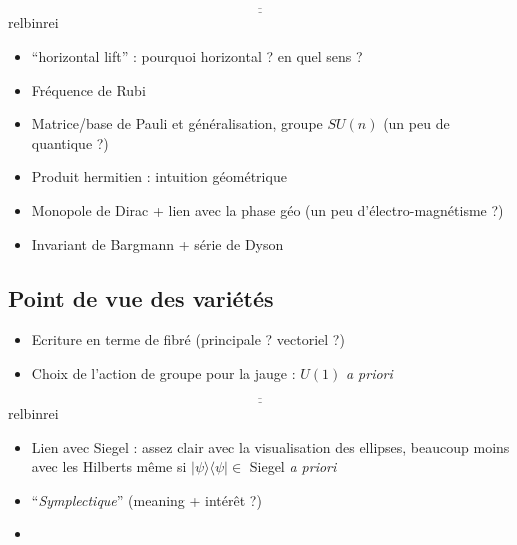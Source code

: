 \documentclass[hidelinks, french, oneside]{article}
\theoremstyle{enonce}
\theoremstyle{special}
\theoremstyle{rq}
\theoremstyle{exo}
\theoremstyle{demo}
\begin{document}
\[\underline{\overline{\qquad\qquad\qquad\qquad\qquad\qquad\qquad\qquad\qquad\qquad\qquad\qquad\qquad\qquad\qquad\qquad\qquad\qquad}}\]{\color{white}relbinrei}

\begin{itemize}
	\item ``horizontal lift'' : pourquoi horizontal ? en quel sens ?
	\item Fréquence de Rubi
	\item Matrice/base de Pauli et généralisation, groupe $SU(n)$ (un peu de quantique ?)
	\item Produit hermitien : intuition géométrique
	\item Monopole de Dirac + lien avec la phase géo (un peu d'électro-magnétisme ?)
	\item Invariant de Bargmann + série de Dyson
\end{itemize}



\subsection{Point de vue des variétés}\label{subsec:phaseG_variete}

\begin{itemize}
	\item Ecriture en terme de fibré (principale ? vectoriel ?)
	
	\item Choix de l'action de groupe pour la jauge : $U(1)$ \textit{a priori}
\end{itemize}

\[\underline{\overline{\qquad\qquad\qquad\qquad\qquad\qquad\qquad\qquad\qquad\qquad\qquad\qquad\qquad\qquad\qquad\qquad\qquad\qquad}}\]{\color{white}relbinrei}

\begin{itemize}
	\item Lien avec Siegel : assez clair avec la visualisation des ellipses, beaucoup moins avec les Hilberts même si $| \psi\rangle \langle \psi |\in$ Siegel \textit{a priori}
	
	\item ``\textit{Symplectique}'' (meaning + intérêt ?)
	
	\item 
\end{itemize}





\newpage

{}

\end{document}
